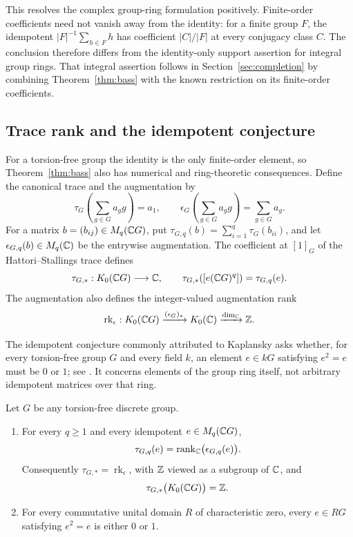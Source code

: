 This resolves the complex group-ring formulation positively. Finite-order
coefficients need not vanish away from the identity: for a finite group
$F$, the idempotent $|F|^{-1}\sum_{h\in F}h$ has coefficient
$|C|/|F|$ at every conjugacy class $C$. The conclusion therefore differs
from the identity-only support assertion for integral group rings.
That integral assertion follows in Section~\ref{sec:completion} by combining
Theorem~\ref{thm:bass} with the known restriction on its finite-order
coefficients.

\subsection{Trace rank and the idempotent conjecture}

For a torsion-free group the identity is the only finite-order element,
so Theorem~\ref{thm:bass} also has numerical and ring-theoretic
consequences. Define the canonical trace and the augmentation by
\[
 \tau_G\!\left(\sum_{g\in G}a_g g\right)=a_1,\qquad
 \epsilon_G\!\left(\sum_{g\in G}a_g g\right)=\sum_{g\in G}a_g.
\]
For a matrix $b=(b_{ij})\in M_q(\mathbb C G)$, put
$\tau_{G,q}(b)=\sum_{i=1}^q\tau_G(b_{ii})$, and let
$\epsilon_{G,q}(b)\in M_q(\mathbb C)$ be the entrywise augmentation.
The coefficient at $[1]_G$ of the Hattori--Stallings trace defines
\[
 \tau_{G,*}:K_0(\mathbb C G)\longrightarrow\mathbb C,\qquad
 \tau_{G,*}([e(\mathbb C G)^q])=\tau_{G,q}(e).
\]
The augmentation also defines the integer-valued augmentation rank
\[
 \operatorname{rk}_{\epsilon}:K_0(\mathbb C G)
 \xrightarrow{(\epsilon_G)_*}K_0(\mathbb C)
 \xrightarrow{\dim_{\mathbb C}}\mathbb Z.
\]

The idempotent conjecture commonly attributed to Kaplansky asks whether,
for every torsion-free group $G$ and every field $k$, an element
$e\in kG$ satisfying $e^2=e$ must be $0$ or $1$; see
\cite[Problem 3]{OW2023}. It concerns elements of the group ring itself,
not arbitrary idempotent matrices over that ring.

\begin{corollary}\label{cor:torsion-free}
Let $G$ be any torsion-free discrete group.
\begin{enumerate}[label=\textup{(\roman*)}]
 \item For every $q\geq1$ and every idempotent $e\in M_q(\mathbb C G)$,
 \[
  \tau_{G,q}(e)=\operatorname{rank}_{\mathbb C}\bigl(\epsilon_{G,q}(e)\bigr).
 \]
 Consequently $\tau_{G,*}=\operatorname{rk}_{\epsilon}$, with
 $\mathbb Z$ viewed as a subgroup of $\mathbb C$, and
 \[
  \tau_{G,*}\bigl(K_0(\mathbb C G)\bigr)=\mathbb Z.
 \]
 \item For every commutative unital domain $R$ of characteristic zero,
 every $e\in RG$ satisfying $e^2=e$ is either $0$ or $1$.
\end{enumerate}
\end{corollary}

